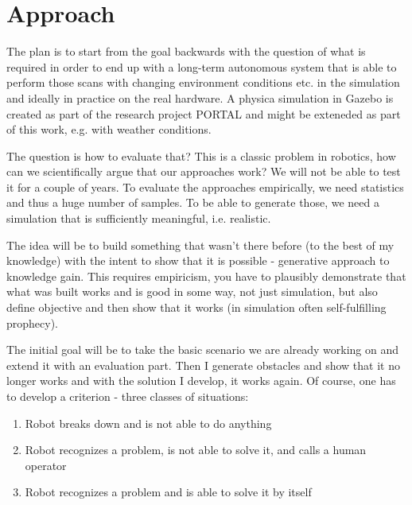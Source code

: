 \documentclass[german, master, expose, latin1]{base/thesis_KBS}
\begin{document}
\section{Approach}

The plan is to start from the goal backwards with the question of what is required in order to end up with a long-term autonomous system that is
able to perform those scans with changing environment conditions etc. in the simulation and ideally in practice on the real hardware.
A physica simulation in Gazebo is created as part of the research project PORTAL and might be exteneded as part of this work, e.g. with weather conditions.\newline

The question is how to evaluate that? This is a classic problem in robotics, how can we scientifically argue that our approaches work? 
We will not be able to test it for a couple of years.
To evaluate the approaches empirically, we need statistics and thus a huge number of samples. To be able to generate those, we need a simulation
that is sufficiently meaningful, i.e. realistic.\newline

The idea will be to build something that wasn't there before (to the best of my knowledge) with the intent to show that it is possible - generative approach to knowledge gain.
This requires empiricism, you have to plausibly demonstrate that what was built works and is good in some way, not just simulation, but also define objective and then 
show that it works (in simulation often self-fulfilling prophecy).\newline

The initial goal will be to take the basic scenario we are already working on and extend it with an evaluation part. Then I generate obstacles and show that it no
longer works and with the solution I develop, it works again. Of course, one has to develop a criterion - three classes of situations:
\begin{enumerate}
    \item Robot breaks down and is not able to do anything
    \item Robot recognizes a problem, is not able to solve it, and calls a human operator
    \item Robot recognizes a problem and is able to solve it by itself
\end{enumerate}
\end{document}
